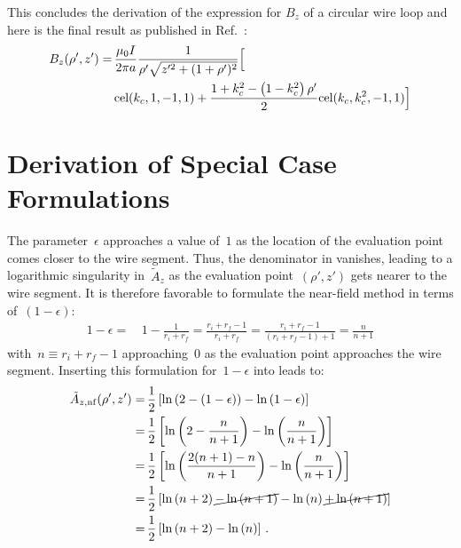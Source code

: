 This concludes the derivation of the expression for $B_z$ of a circular wire loop
and here is the final result as published in Ref.~\cite{teal}:
\begin{align}
 B_z(\rho', z')
 =&\, \frac{\mu_0 I}{2 \pi a}
   \frac{1}{\rho' \sqrt{z'^2 + (1 + \rho')^2}}
   \Bigl[ \nonumber \\
 ~&\, \textrm{cel}(k_c, 1, -1, 1)
     + \frac{1 + k_c^2 - \left( 1 - k_c^2 \right) \rho'}{2} \textrm{cel}(k_c, k_c^2, -1, 1)
   \Bigr]
\end{align}

\section{Derivation of Special Case Formulations}
\label{apx:derivation_of_special_case_formulations}


The parameter~$\epsilon$ approaches a value of~$1$ as the location of the evaluation point comes closer to the wire segment.
Thus, the denominator in  vanishes, leading to a logarithmic singularity in~$\tilde{A}_z$
as the evaluation point~$(\rho', z')$ gets nearer to the wire segment.
It is therefore favorable to formulate the near-field method in terms of~$(1-\epsilon)$:
\begin{align}
  1-\epsilon =&\, 1 - \frac{1}{r_i + r_f} = \frac{r_i + r_f - 1}{r_i + r_f} = \frac{r_i + r_f - 1}{(r_i + r_f - 1) + 1} = \frac{n}{n + 1}
\end{align}
with~$n \equiv r_i + r_f - 1$ approaching~$0$ as the evaluation point approaches the wire segment.
Inserting this formulation for~$1-\epsilon$ into  leads to:
\begin{align}
  \tilde{A}_{z,\mathrm{nf}} (\rho', z')
  =&\, \frac{1}{2}  \left[ \ln\left(2 - (1-\epsilon)        \right) - \ln \left(1 - \epsilon    \right) \right] \nonumber \\
  =&\, \frac{1}{2}  \left[ \ln\left(2 - \frac{n}{n + 1}     \right) - \ln \left(\frac{n}{n + 1} \right) \right] \nonumber \\
  =&\, \frac{1}{2}  \left[ \ln\left(\frac{2(n+1) - n}{n + 1}\right) - \ln \left(\frac{n}{n + 1} \right) \right] \nonumber \\
  =&\, \frac{1}{2}  \left[ \ln\left(n + 2                   \right) \cancel{- \ln\left(n + 1 \right)} - \ln \left( n \right) \cancel{+ \ln \left( n + 1 \right)} \right] \nonumber \\
  =&\, \frac{1}{2}  \left[ \ln\left(n + 2                   \right) - \ln \left( n \right) \right] \, .
\end{align}




